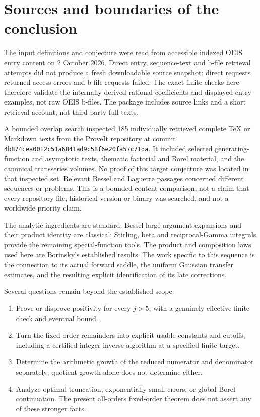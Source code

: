 \documentclass[11pt,letterpaper]{article}
\numberwithin{equation}{section}
\theoremstyle{remark}\newtheorem{remark}[theorem]{Remark}
\begin{document}
\section{Sources and boundaries of the conclusion}
The input definitions and conjecture were read from accessible indexed OEIS entry content on 2 October 2026. Direct entry, sequence-text and b-file retrieval attempts did not produce a fresh downloadable source snapshot: direct requests returned access errors and b-file requests failed. The exact finite checks here therefore validate the internally derived rational coefficients and displayed entry examples, not raw OEIS b-files. The package includes source links and a short retrieval account, not third-party full texts.

A bounded overlap search inspected 185 individually retrieved complete TeX or Markdown texts from the ProveIt repository at commit
\texttt{4b874cea0012c51a6841ad9c58f6e20fa57c71da}. It included selected generating-function and asymptotic texts, thematic factorial and Borel material, and the canonical transseries volumes. No proof of this target conjecture was located in that inspected set. Relevant Bessel and Laguerre passages concerned different sequences or problems. This is a bounded content comparison, not a claim that every repository file, historical version or binary was searched, and not a worldwide priority claim.

The analytic ingredients are standard. Bessel large-argument expansions and their product identity are classical; Stirling, beta and reciprocal-Gamma integrals provide the remaining special-function tools. The product and composition laws used here are Borinsky's established results. The work specific to this sequence is the connection to its actual forward saddle, the uniform Gaussian transfer estimates, and the resulting explicit identification of its late corrections.

Several questions remain beyond the established scope:
\begin{enumerate}\setlength{\itemsep}{0pt}\setlength{\parsep}{0pt}
\item Prove or disprove positivity for every $j>5$, with a genuinely effective finite check and eventual bound.
\item Turn the fixed-order remainders into explicit usable constants and cutoffs, including a certified integer inverse algorithm at a specified finite target.
\item Determine the arithmetic growth of the reduced numerator and denominator separately; quotient growth alone does not determine either.
\item Analyze optimal truncation, exponentially small errors, or global Borel continuation. The present all-orders fixed-order theorem does not assert any of these stronger facts.
\end{enumerate}
\end{document}
